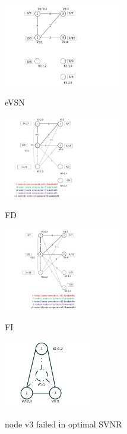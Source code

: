 \begin{figure}
\centering
\includegraphics[width=2in]{Fig/eVSN}\\
\caption{eVSN}\label{fig:eVSN}
\end{figure}
\begin{figure}
\centering
\includegraphics[width=2in]{Fig/FD}\\
\caption{FD}\label{fig:FD}
\end{figure}
\begin{figure}
\centering
\includegraphics[width=2in]{Fig/FI}\\
\caption{FI}\label{fig:FI}
\end{figure}



\begin{figure}
\centering
\includegraphics[width=1.5in]{Fig/SVNR_opt_n1}\\
\caption{node v3 failed in optimal SVNR}\label{fig:optgraph_n1_fail}
\end{figure}

